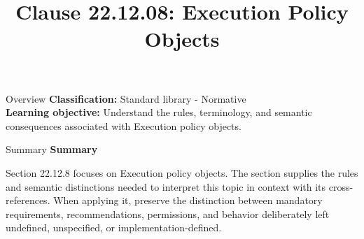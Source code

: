 \documentclass[10pt,letterpaper]{article}
\title{Clause 22.12.08: Execution Policy Objects}
\author{}
\date{}
\begin{document}
\maketitle
\begin{CornellOverviewBox}{Overview}
\textbf{Classification:} Standard library - Normative\\[2pt]
\textbf{Learning objective:} Understand the rules, terminology, and semantic consequences associated with Execution policy objects.
\end{CornellOverviewBox}\begin{CornellSummaryBox}{Summary}
{\sffamily\bfseries\color{Accent} Summary}\par\vspace{3pt}Section 22.12.8 focuses on Execution policy objects. The section supplies the rules and semantic distinctions needed to interpret this topic in context with its cross-references. When applying it, preserve the distinction between mandatory requirements, recommendations, permissions, and behavior deliberately left undefined, unspecified, or implementation-defined.
\end{CornellSummaryBox}
\end{document}
